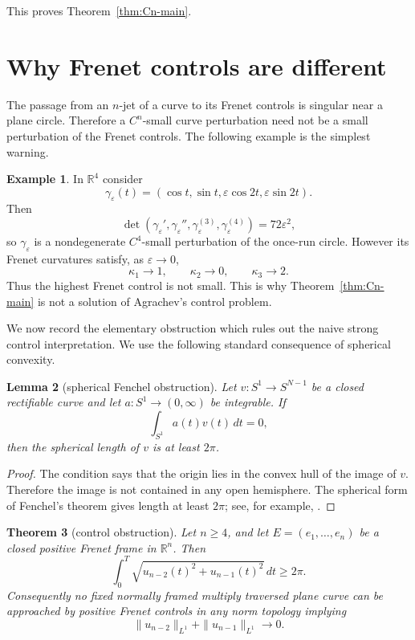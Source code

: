 \documentclass[11pt,reqno]{amsart}
\newtheorem{theorem}{Theorem}[section]
\newtheorem{lemma}[theorem]{Lemma}
\theoremstyle{definition}
\newtheorem{example}[theorem]{Example}
\theoremstyle{remark}
\newcommand{\R}{\mathbb R}
\newcommand{\eps}{\varepsilon}
\begin{document}
This proves Theorem~\ref{thm:Cn-main}.

\section{Why Frenet controls are different}

The passage from an $n$-jet of a curve to its Frenet controls is singular near a
plane circle.  Therefore a $C^n$-small curve perturbation need not be a small
perturbation of the Frenet controls.  The following example is the simplest warning.

\begin{example}\label{ex:dimension-four-warning}
In $\R^4$ consider
\[
        \gamma_\eps(t)=(\cos t,\sin t,\eps\cos2t,\eps\sin2t).
\]
Then
\[
        \det(\gamma_\eps',\gamma_\eps'',\gamma_\eps^{(3)},\gamma_\eps^{(4)})
        =72\eps^2,
\]
so $\gamma_\eps$ is a nondegenerate $C^4$-small perturbation of the once-run circle.
However its Frenet curvatures satisfy, as $\eps\to0$,
\[
        \kappa_1\to1,
        \qquad
        \kappa_2\to0,
        \qquad
        \kappa_3\to2.
\]
Thus the highest Frenet control is not small.  This is why Theorem~\ref{thm:Cn-main}
is not a solution of Agrachev's control problem.
\end{example}

We now record the elementary obstruction which rules out the naive strong control
interpretation.  We use the following standard consequence of spherical convexity.

\begin{lemma}[spherical Fenchel obstruction]\label{lem:spherical-obstruction}
Let $v:S^1\to S^{N-1}$ be a closed rectifiable curve and let $a:S^1\to(0,\infty)$
be integrable.  If
\[
        \int_{S^1}a(t)v(t)\,dt=0,
\]
then the spherical length of $v$ is at least $2\pi$.
\end{lemma}

\begin{proof}
The condition says that the origin lies in the convex hull of the image of $v$.
Therefore the image is not contained in any open hemisphere.  The spherical form of
Fenchel's theorem gives length at least $2\pi$; see, for example,
\cite{Fenchel,Milnor}.
\end{proof}

\begin{theorem}[control obstruction]\label{thm:strong-control-obstruction}
Let $n\ge4$, and let $E=(e_1,\ldots,e_n)$ be a closed positive Frenet frame in
$\R^n$.  Then
\begin{equation}\label{eq:last-bound}
        \int_0^T\sqrt{u_{n-2}(t)^2+u_{n-1}(t)^2}\,dt\ge2\pi .
\end{equation}
Consequently no fixed normally framed multiply traversed plane curve can be
approached by positive Frenet controls in any norm topology implying
\[
        \|u_{n-2}\|_{L^1}+\|u_{n-1}\|_{L^1}\longrightarrow0.
\]
\end{theorem}
\end{document}
